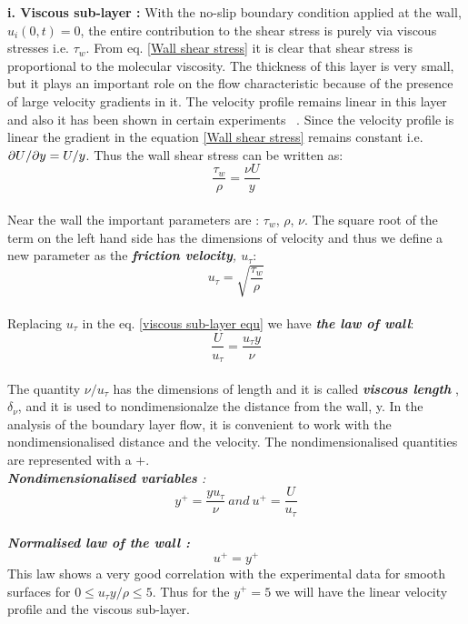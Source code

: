 \textbf{i. Viscous sub-layer :} With the no-slip boundary condition applied at the wall, \emph{$u_i(0,t) = 0$}, the entire contribution to the shear stress is purely via viscous stresses i.e. $\tau_w$. From eq. \ref{Wall shear stress} it is clear that shear stress is proportional to the molecular viscosity. The thickness of this layer is very small, but it plays an important role on the flow characteristic because of the presence of large velocity gradients in it. The velocity profile remains linear in this layer and also it has been shown in certain experiments ~\cite{cengel:book}. Since the velocity profile is linear the gradient in the equation \ref{Wall shear stress} remains constant i.e. ${\partial U}/{\partial y} = {U}/{y} $. Thus the wall shear stress can be written as:
\begin{equation}
	\label{viscous sub-layer equ}
	\frac{\tau_w}{\rho} = \frac{\nu U}{y}
\end{equation}\\
Near the wall the important parameters are : $\tau_w$, $\rho$, $\nu$. The square root of the term on the left hand side has the dimensions of velocity and thus we define a new parameter as the \emph{\textbf{friction velocity}, $u_\tau$}:
\begin{equation}
	\label{friction velociy}
	u_\tau = \sqrt{\frac{\tau_w}{\rho}}
\end{equation}\\
Replacing $u_\tau$ in the eq. \ref{viscous sub-layer equ} we have \emph{\textbf{the law of wall}}:
\begin{equation}
	\label{law of wall}
	\frac{U}{u_\tau} =  \frac{u_\tau y}{\nu}
\end{equation}\\
The quantity $\nu / u_\tau $ has the dimensions of length and it is called \emph{\textbf{viscous length}} , $\delta_\nu$,  and it is used to nondimensionalze the distance from the wall, y. In the analysis of the boundary layer flow, it is convenient to work with the nondimensionalised distance and the velocity. The nondimensionalised quantities are represented with a $+$. \\
\emph{\textbf{Nondimensionalised variables} : } \begin{equation}
	\label{nondimensions}
	y^+ = \frac{y u_\tau }{\nu} \    and \    u^+ = \frac{U}{u_\tau}
\end{equation}\\
\emph{\textbf{Normalised law of the wall : }}\begin{equation}
	\label{nondimensions law of wall}
	u^+ = y^+ 
\end{equation}
This law shows a very good correlation with the experimental data for smooth surfaces for $0\leq {u_\tau y}/{\rho} \leq 5	$. Thus for the $y^+ =  5$ we will have the linear velocity profile and the viscous sub-layer. \\

